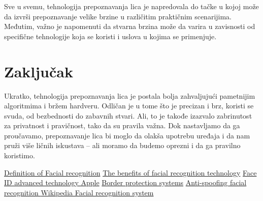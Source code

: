 \documentclass[a4paper]{article}
\begin{document}
Sve u svemu, tehnologija prepoznavanja lica je napredovala do tačke u kojoj može da izvrši prepoznavanje velike brzine u različitim praktičnim scenarijima. Međutim, važno je napomenuti da stvarna brzina može da varira u zavisnosti od specifične tehnologije koja se koristi i uslova u kojima se primenjuje. 


\section{Zaključak}
\label{sec: zaključak }
Ukratko, tehnologija prepoznavanja lica je postala bolja zahvaljujući pametnijim algoritmima i bržem hardveru. Odličan je u tome što je precizan i brz, koristi se svuda, od bezbednosti do zabavnih stvari. Ali, to je takođe izazvalo zabrinutost za privatnost i pravičnost, tako da su pravila važna. Dok nastavljamo da ga proučavamo, prepoznavanje lica bi moglo da olakša upotrebu uređaja i da nam pruži više ličnih iskustava – ali moramo da budemo oprezni i da ga pravilno koristimo.



\appendix

\begin{thebibliography}{6}

 \href{https://www.techtarget.com/searchenterpriseai/definition/facial-recognition}{Definition of Facial recognition}
 \href{https://aws.amazon.com/what-is/facial-recognition/#:~:text=taken%20years%20earlier.-,Is%20facial%20recognition%20safe%3F,identification%20methods%20in%20biometric%20technology}{The benefits of facial recognition technology}
 \href{https://support.apple.com/en-us/HT208108 }{Face ID advanced technology Apple}
 \href{https://www.biometricupdate.com/202003/seeing-is-identifying-new-border-protection-systems-train-how-to-spot-impostors }{Border protection systems}
 \href{https://www.idnow.io/blog/fraud-detection-anti-spoofing-facial-recognition/ }{Anti-spoofing facial recognition }
 \href{https://en.wikipedia.org/wiki/Facial_recognition_system }{Wikipedia Facial recognition system}



\end{thebibliography}
\end{document}
